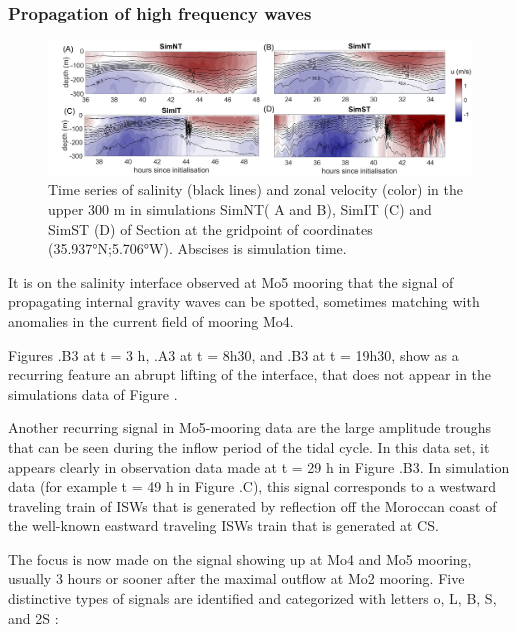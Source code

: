 \subsubsection{Propagation of high frequency waves}

\begin{figure}[!h]
 \includegraphics[width=\textwidth]{./GBR3D/US_M4SimMIV.png}
 \caption [Time series of salinity and zonal velocity in simulations SimNT, SimIT and SimST]{Time series of salinity (black lines) and zonal velocity (color) in the upper 300 m in simulations SimNT( A and B), SimIT (C) and SimST (D) of Section  at the gridpoint of coordinates (35.937°N;5.706°W). Abscises is simulation time. }
 \label{Fig_moor_USs}
\end{figure}

It is on the salinity interface observed at Mo5 mooring that the signal of propagating internal gravity waves can be spotted, sometimes matching with anomalies in the current field of mooring Mo4.

Figures .B3 at t = 3 h, .A3 at t = 8h30, and .B3 at t = 19h30, show as a recurring feature an abrupt lifting of the interface, that does not appear in the simulations data of Figure .

Another recurring signal in Mo5-mooring data are the large amplitude troughs that can be seen during the inflow period of the tidal cycle. In this data set, it appears clearly in observation data made at t = 29 h in Figure .B3. In simulation data (for example t = 49 h in Figure .C), this signal corresponds to a westward traveling train of ISWs that is generated by reflection off the Moroccan coast of the well-known eastward traveling ISWs train that is generated at CS.

The focus is now made on the signal showing up at Mo4 and Mo5 mooring, usually 3 hours or sooner after the maximal outflow at Mo2 mooring. Five distinctive types of signals are identified and categorized with letters o, L, B, S, and 2S :

